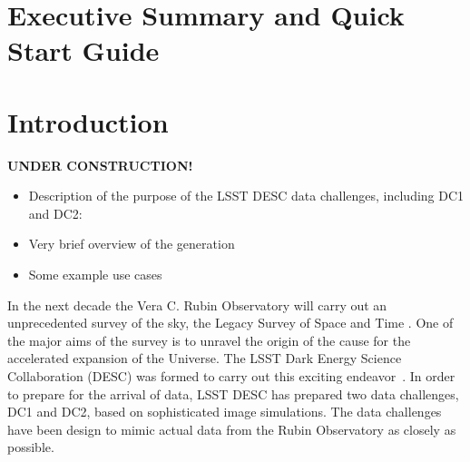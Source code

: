 \documentclass[11pt]{report}
\begin{document}
\setlength\parindent{0em}
\setlength{\parskip}{0.5em}



\renewcommand{\thepage}{\arabic{page}}
\setcounter{page}{1}

\renewcommand\thefigure{\arabic{figure}}
\setcounter{figure}{0}


\section*{Executive Summary and Quick Start Guide}




\section{Introduction}

{\bf UNDER CONSTRUCTION!}

\begin{itemize}
\item Description of the purpose of the LSST DESC data challenges, including DC1 and DC2:
\item Very brief overview of the generation
\item Some example use cases
\end{itemize}

In the next decade the Vera C. Rubin Observatory will carry out an unprecedented survey of the sky, the Legacy Survey of Space and Time \citep{2009arXiv0912.0201L}. One of the major aims of the survey is to unravel the origin of the cause for the accelerated expansion of the Universe. The LSST Dark Energy Science Collaboration (DESC) was formed to carry out this exciting endeavor~\citep{Abate:2012za}. In order to prepare for the arrival of data, LSST DESC has prepared two data challenges, DC1 and DC2, based on sophisticated image simulations. The data challenges have been design to mimic actual data from the Rubin Observatory as closely as possible. 
\end{document}
